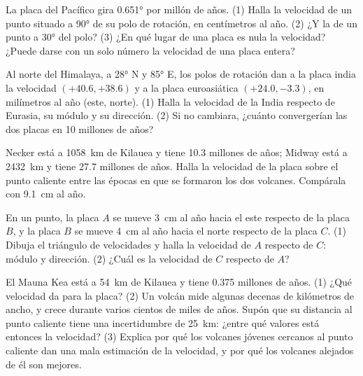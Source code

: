 \begin{exercise}[$\star\star$]\label{exo:g11:plate-motions:8}
La placa del Pacífico gira \ang{0.651} por millón de años. (1) Halla la
velocidad de un punto situado a \ang{90} de su polo de rotación, en
centímetros al año. (2) ¿Y la de un punto a \ang{30} del polo? (3) ¿En qué
lugar de una placa es nula la velocidad? ¿Puede darse con un solo número la
velocidad de una placa entera?
\end{exercise}

\begin{exercise}[$\star\star$]\label{exo:g11:plate-motions:9}
Al norte del Himalaya, a \ang{28} N y \ang{85} E, los polos de rotación dan a
la placa india la velocidad $(+40.6, +38.6)$ y a la placa euroasiática
$(+24.0, -3.3)$, en milímetros al año (este, norte). (1) Halla la velocidad de
la India respecto de Eurasia, su módulo y su dirección. (2) Si no cambiara,
¿cuánto convergerían las dos placas en 10 millones de años?
\end{exercise}

\begin{exercise}[$\star\star$]\label{exo:g11:plate-motions:10}
Necker está a \qty{1058}{km} de Kilauea y tiene \num{10.3} millones de años;
Midway está a \qty{2432}{km} y tiene \num{27.7} millones de años. Halla la
velocidad de la placa sobre el punto caliente entre las épocas en que se
formaron los dos volcanes. Compárala con \qty{9.1}{cm} al año.
\end{exercise}

\begin{exercise}[$\star\star$]\label{exo:g11:plate-motions:11}
En un punto, la placa $A$ se mueve \qty{3}{cm} al año hacia el este respecto
de la placa $B$, y la placa $B$ se mueve \qty{4}{cm} al año hacia el norte
respecto de la placa $C$. (1) Dibuja el triángulo de velocidades y halla la
velocidad de $A$ respecto de $C$: módulo y dirección. (2) ¿Cuál es la
velocidad de $C$ respecto de $A$?
\end{exercise}

\begin{exercise}[$\star\star\star$]\label{exo:g11:plate-motions:12}
El Mauna Kea está a \qty{54}{km} de Kilauea y tiene \num{0.375} millones de
años. (1) ¿Qué velocidad da para la placa? (2) Un volcán mide algunas decenas
de kilómetros de ancho, y crece durante varios cientos de miles de años.
Supón que su distancia al punto caliente tiene una incertidumbre de
\qty{25}{km}: ¿entre qué valores está entonces la velocidad? (3) Explica por
qué los volcanes jóvenes cercanos al punto caliente dan una mala estimación de
la velocidad, y por qué los volcanes alejados de él son mejores.
\end{exercise}

